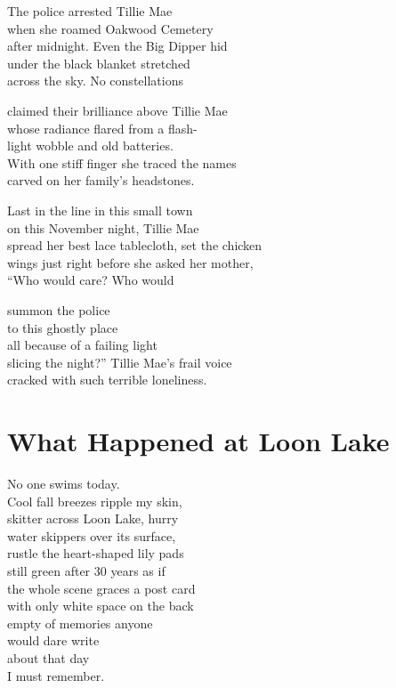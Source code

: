 \documentclass[twoside,10pt]{book}
\begin{document}
The police arrested Tillie Mae\\
when she roamed Oakwood Cemetery\\
after midnight. Even the Big Dipper hid\\
under the black blanket stretched\\
across the sky. No constellations

claimed their brilliance above Tillie Mae\\
whose radiance flared from a flash-\\
light wobble and old batteries.\\
With one stiff finger she traced the names\\
carved on her family's headstones.

Last in the line in this small town\\
on this November night, Tillie Mae\\
spread her best lace tablecloth, set the chicken\\
wings just right before she asked her mother,\\
``Who would care? Who would

summon the police\\
to this ghostly place\\
all because of a failing light\\
slicing the night?'' Tillie Mae's frail voice\\
cracked with such terrible loneliness.


\clearpage
\section{What Happened at Loon Lake}

No one swims today.\\
Cool fall breezes ripple my skin,\\
skitter across Loon Lake, hurry\\
water skippers over its surface,\\
rustle the heart-shaped lily pads\\
still green after 30 years as if\\
the whole scene graces a post card\\
with only white space on the back\\
empty of memories anyone\\
would dare write\\
about that day\\
I must remember.
\end{document}
